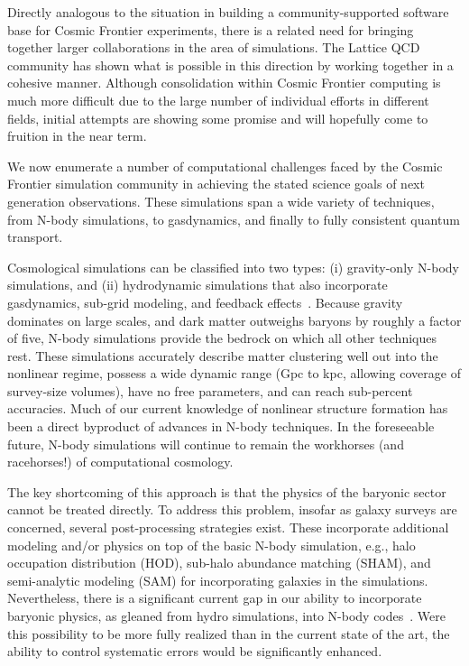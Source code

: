 Directly analogous to the situation in building a community-supported
software base for Cosmic Frontier experiments, there is a related need
for bringing together larger collaborations in the area of
simulations. The Lattice QCD community has shown what is possible in
this direction by working together in a cohesive manner. Although
consolidation within Cosmic Frontier computing is much more difficult
due to the large number of individual efforts in different fields,
initial attempts are showing some promise and will hopefully come to
fruition in the near term.

\medskip


We now enumerate a number of computational challenges faced by the
Cosmic Frontier simulation community in achieving the stated science
goals of next generation observations. These simulations span a wide
variety of techniques, from N-body simulations, to gasdynamics, and
finally to fully consistent quantum transport.

\medskip


Cosmological simulations can be classified into two types: (i)
gravity-only N-body simulations, and (ii) hydrodynamic simulations
that also incorporate gasdynamics, sub-grid modeling, and feedback
effects~\cite{dolag}. Because gravity dominates on large scales, and
dark matter outweighs baryons by roughly a factor of five, N-body
simulations provide the bedrock on which all other techniques
rest. These simulations accurately describe matter clustering well out
into the nonlinear regime, possess a wide dynamic range (Gpc to kpc,
allowing coverage of survey-size volumes), have no free parameters,
and can reach sub-percent accuracies. Much of our current knowledge of
nonlinear structure formation has been a direct byproduct of advances
in N-body techniques. In the foreseeable future, N-body simulations
will continue to remain the workhorses (and racehorses!) of
computational cosmology.

The key shortcoming of this approach is that the physics of the
baryonic sector cannot be treated directly. To address this problem,
insofar as galaxy surveys are concerned, several post-processing
strategies exist. These incorporate additional modeling and/or physics
on top of the basic N-body simulation, e.g., halo occupation
distribution (HOD), sub-halo abundance matching (SHAM), and
semi-analytic modeling (SAM) for incorporating galaxies in the
simulations. Nevertheless, there is a significant current gap in our
ability to incorporate baryonic physics, as gleaned from hydro
simulations, into N-body codes~\cite{motext}. Were this possibility to
be more fully realized than in the current state of the art, the
ability to control systematic errors would be significantly enhanced.

